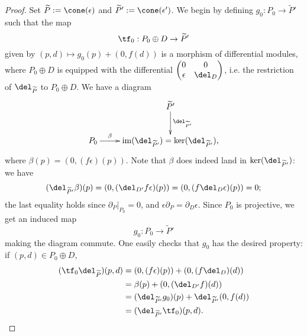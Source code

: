 \documentclass[12pt]{amsart}
\theoremstyle{definition}
\theoremstyle{remark}
\newcommand{\im}{\operatorname{im}}
\def\tP{\widetilde{P}}
\begin{document}
\begin{proof}
Set $\tP := \cone(\epsilon)$ and $\tP':= \cone(\epsilon')$. We begin by defining $g_0 : P_0 \to \tP'$ such that the map
$$
\tf_0 : P_0 \oplus D \to \tP'
$$
given by $(p, d) \mapsto g_0(p) + (0, f(d))$ is a morphism of differential modules, where $P_0 \oplus D$ is equipped with the differential $\begin{pmatrix} 0 & 0 \\ \epsilon & \del_D \end{pmatrix}$, i.e. the restriction of $\del_{\tP}$ to $P_0 \oplus D$. We have a diagram 
$$
\xymatrix{
& \tP' \ar[d]^-{\del_{\tP'}} \\
P_0 \ar[r]^-{\beta} & \im(\del_{\tP'}) = \ker(\del_{\tP'}),
}
$$
where $\beta(p) = (0, (f  \epsilon)(p))$. Note that $\beta$ does indeed land in $\ker(\del_{\tP'})$: we have
$$
(\del_{\tP'}  \beta)(p) = (0, (\del_{D'}  f  \epsilon)(p)) = (0, (f  \del_{D}  \epsilon)(p)) = 0;
$$
the last equality holds since $\partial_{P}|_{P_0} = 0$, and $\epsilon \partial_P = \partial_D \epsilon$. Since $P_0$ is projective, we get an induced map
$$
g_0 : P_0 \to \tP'
$$
making the diagram commute. One easily checks that $g_0$ has the desired property: if $(p,d) \in P_0 \oplus D$,
\begin{align*}
(\tf_0  \del_{\tP})(p, d) & = (0, (f  \epsilon)(p) )+ (0, (f  \del_D)(d)) \\
&=  \beta(p) +(0,  (\del_{D'}  f)(d)) \\
&= (\del_{\tP'}  g_0)(p) + \del_{\tP'}(0, f(d)) \\
&= (\del_{\tP'}  \tf_0)(p, d).
\end{align*}


\end{proof}
\end{document}
